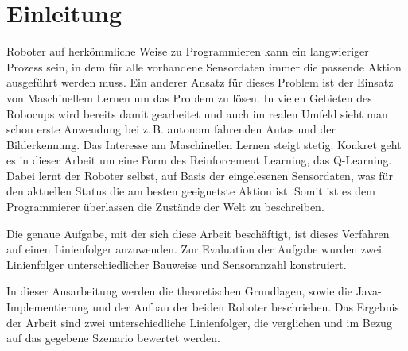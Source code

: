 \chapter{Einleitung} %
\label{cha:einleitung}

Roboter auf herkömmliche Weise zu Programmieren kann ein langwieriger Prozess sein, in dem für alle vorhandene Sensordaten immer die passende Aktion ausgeführt werden muss. Ein anderer Ansatz für dieses Problem ist der Einsatz von Maschinellem Lernen um das Problem zu lösen. In vielen Gebieten des Robocups wird bereits damit gearbeitet und auch im realen Umfeld sieht man schon erste Anwendung bei z.\,B. autonom fahrenden Autos und der Bilderkennung. Das Interesse am Maschinellen Lernen steigt stetig. Konkret geht es in dieser Arbeit um eine Form des Reinforcement Learning, das Q-Learning. Dabei lernt der Roboter selbst, auf Basis der eingelesenen Sensordaten, was für den aktuellen Status die am besten geeignetste Aktion ist. Somit ist es dem Programmierer überlassen die Zustände der Welt zu beschreiben.\par
Die genaue Aufgabe, mit der sich diese Arbeit beschäftigt, ist dieses Verfahren auf einen Linienfolger anzuwenden. Zur Evaluation der Aufgabe wurden zwei Linienfolger unterschiedlicher Bauweise und Sensoranzahl konstruiert.\par
In dieser Ausarbeitung werden die theoretischen Grundlagen, sowie die Java-Im\-ple\-men\-tierung und der Aufbau der beiden Roboter beschrieben. Das Ergebnis der Arbeit sind zwei unterschiedliche Linienfolger, die verglichen und im Bezug auf das gegebene Szenario bewertet werden.

